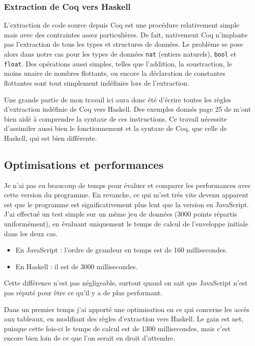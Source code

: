\documentclass[]{article}
\begin{document}
\subsubsection{Extraction de Coq vers Haskell}
L'extraction de code source depuis Coq est une procédure relativement simple mais avec des contraintes assez particulières. De fait, nativement Coq n'implante pas l'extraction de tous les types et structures de données. Le problème se pose alors dans notre cas pour les types de données \texttt{nat} (entiers naturels), \texttt{bool} et \texttt{float}. Des opérations aussi simples, telles que l'addition, la soustraction, le moins unaire de nombres flottants, ou encore la déclaration de constantes flottantes sont tout simplement indéfinies lors de l'extraction.

Une grande partie de mon travail ici aura donc été d'écrire toutes les règles d'extraction indéfinie de Coq vers Haskell. Des exemples donnés page 25 de \cite{magaud:hal-01066671} m'ont bien aidé à comprendre la syntaxe de ces instructions. Ce travail nécessite d'assimiler aussi bien le fonctionnement et la syntaxe de Coq, que celle de Haskell, qui est bien différente.

\subsection{Optimisations et performances}\label{sec:optimisations}
Je n'ai pas eu beaucoup de temps pour évaluer et comparer les performances avec cette version du programme. En revanche, ce qui m'est très vite devenu apparent est que le programme est significativement plus lent que la version en JavaScript. J'ai effectué un test simple sur un même jeu de données (3000 points répartis uniformément), en évaluant uniquement le temps de calcul de l'enveloppe initiale dans les deux cas.
\begin{itemize}
	\item En JavaScript : l'ordre de grandeur en temps est de 160 millisecondes.
	\item En Haskell : il est de 3000 millisecondes.
\end{itemize}
Cette différence n'est pas négligeable, surtout quand on sait que JavaScript n'est pas réputé pour être ce qu'il y a de plus performant.

Dans un premier temps j'ai apporté une optimisation en ce qui concerne les accès aux tableaux, en modifiant des règles d'extraction vers Haskell. Le gain est net, puisque cette fois-ci le temps de calcul est de 1300 millisecondes, mais c'est encore bien loin de ce que l'on serait en droit d'attendre.
\end{document}
